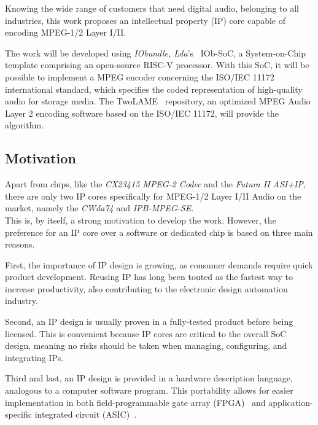 Knowing the wide range of customers that need digital audio, belonging to all industries, this work proposes an intellectual property (IP) core capable of encoding MPEG-1/2 Layer I/II. 

The work will be developed using \textit{IObundle, Lda}'s~\cite{iobundle} IOb-SoC, a System-on-Chip template comprising an open-source RISC-V processor. 
With this SoC, it will be possible to implement a MPEG encoder concerning the ISO/IEC 11172 international standard, which specifies the coded representation of high-quality audio for storage media. The TwoLAME~\cite{twolame} repository, an optimized MPEG Audio Layer 2 encoding software based on the ISO/IEC 11172, will provide the algorithm.

\subsection{Motivation}
Apart from chips, like the \textit{CX23415 MPEG-2 Codec} and the \textit{Futura II ASI+IP}, there are only two IP cores specifically for MPEG-1/2 Layer I/II Audio on the market, namely the \textit{CWda74} and \textit{IPB-MPEG-SE}.\\
This is, by itself, a strong motivation to develop the work. However, the preference for an IP core over a software or dedicated chip is based on three main reasons.

First, the importance of IP design is growing, as consumer demands require quick product development. Reusing IP has long been touted as the fastest way to increase productivity, also contributing to the electronic design automation industry.

Second, an IP design is usually proven in a fully-tested product before being licensed. This is convenient because IP cores are critical to the overall SoC design, meaning no risks should be taken when managing, configuring, and integrating IPs.

Third and last, an IP design is provided in a hardware description language, analogous to a computer software program. This portability allows for easier implementation in both field-programmable gate array (FPGA)~\cite{fpga} and application-specific integrated circuit (ASIC)~\cite{asic}.


